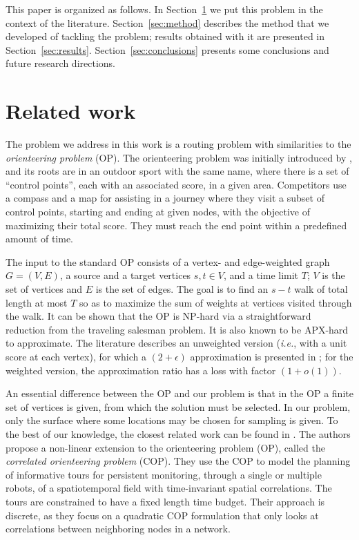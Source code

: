\documentclass[smallextended]{svjour3}
\newcommand{\ie}{\emph{i.e.}}
\begin{document}
This paper is organized as follows.  In Section~\ref{sec:litreview} we put this problem in the context of the literature.  Section~\ref{sec:method} describes the method that we developed of tackling the problem; results obtained with it are presented in Section~\ref{sec:results}.  Section~\ref{sec:conclusions} presents some conclusions and future research directions.

\section{Related work}
\label{sec:litreview}

The problem we address in this work is a routing problem with similarities to the \emph{orienteering problem} (OP).  The orienteering problem was initially introduced by \citet{golden1981gtsp}, and its roots are in an outdoor sport with the same name, where there is a set of ``control points'', each with an associated score, in a given area.  Competitors use a compass and a map for assisting in a journey where they visit a subset of control points, starting and ending at given nodes, with the objective of maximizing their total score.  They must reach the end point within a predefined amount of time.

The input to the standard OP consists of a vertex- and edge-weighted graph $G = (V, E)$, a source and a target vertices $s, t \in V$, and a time limit $T$; $V$ is the set of vertices and $E$ is the set of edges.  The goal is to find an $s-t$ walk of total length at most $T$ so as to maximize the sum of weights at vertices visited through the walk.
It can be shown that the OP is NP-hard via a straightforward reduction from the traveling salesman problem.  It is also known to be APX-hard to approximate.  The literature describes an unweighted version (\ie, with a unit score at each vertex), for which a $(2+\epsilon)$ approximation is presented in \citet{Chekuri2012}; for the weighted version, the approximation ratio has a loss with factor $(1 + o(1))$.

An essential difference between the OP and our problem is that in the OP a finite set of vertices is given, from which the solution must be selected.  In our problem, only the surface where some locations may be chosen for sampling is given.  To the best of our knowledge, the closest related work can be found in \citep{Yu2016}. The authors propose a non-linear extension to the orienteering problem (OP), called the \emph{correlated orienteering problem} (COP). They use the COP to model the planning of informative tours for persistent monitoring, through a single or multiple robots, of a spatiotemporal field with time-invariant spatial correlations. The tours are constrained to have a fixed length time budget. Their approach is discrete, as they focus on a quadratic COP formulation that only looks at correlations between neighboring nodes in a network.
\end{document}
